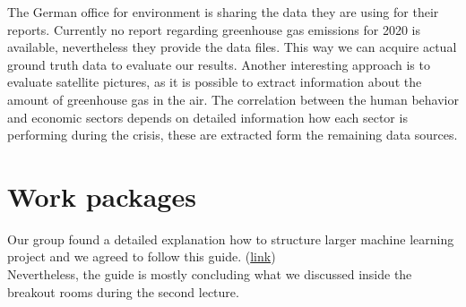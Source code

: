 \documentclass[lang=english,inputenc=utf8,fontsize=10pt]{ldvarticle}
\begin{document}
The German office for environment is sharing the data they are using for their reports. Currently no report regarding greenhouse gas emissions for 2020 is available, nevertheless they provide the data files. This way we can acquire actual ground truth data to evaluate our results. Another interesting approach is to evaluate satellite pictures, as it is possible to extract information about the amount of greenhouse gas in the air. The correlation between the human behavior and economic sectors depends on detailed information how each sector is performing during the crisis, these are extracted form the remaining data sources.
\newpage

\section{Work packages}
\label{workp}
Our group found a detailed explanation how to structure larger machine learning project and we agreed to follow this guide. (\href{https://www.jeremyjordan.me/ml-projects-guide/}{link}) \\
Nevertheless, the guide is mostly concluding what we discussed inside the breakout rooms during the second lecture.\\
\end{document}
